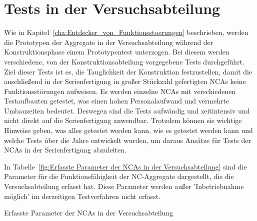 \section{Tests in der Versuchsabteilung}\label{cha_Tests_in_der_Versuchsabteilung}

Wie in Kapitel~\ref{cha:Entdecker_von_Funktionsstoerungen} beschrieben, werden die Prototypen der Aggregate in der Versuchsabteilung während der Konstruktionsphase einem Prototypentest unterzogen. Bei diesem werden verschiedene, von der Konstruktionsabteilung vorgegebene Tests durchgeführt. Ziel dieser Tests ist es, die Tauglichkeit der Konstruktion festzustellen, damit die anschließend in der Serienfertigung in großer Stückzahl gefertigten NCAs keine Funktionsstörungen aufweisen. Es werden einzelne NCAs mit verschiedenen Testaufbauten getestet, was einen hohen Personalaufwand und vermehrte Umbauzeiten bedeutet. Deswegen sind die Tests aufwändig und zeitintensiv und nicht direkt auf die Serienfertigung anwendbar. Trotzdem können sie wichtige Hinweise geben, was alles getestet werden kann, wie es getestet werden kann und welche Tests über die Jahre entwickelt wurden, um daraus Ansätze für Tests der NCAs in der Serienfertigung abzuleiten.

In Tabelle~\ref{fig:Erfasste Parameter der NCAs in der Versuchsabteilung} sind die Parameter für die Funktionsfähigkeit der NC-Aggregate dargestellt, die die Versuchsabteilung erfasst hat. Diese Parameter werden außer 'Inbetriebnahme möglich' im derzeitigen Testverfahren nicht erfasst.



\begin{table}[h]
\center
{}
\caption{Erfasste Parameter der NCAs in der Versuchsabteilung}
\label{fig:Erfasste Parameter der NCAs in der Versuchsabteilung}
\end{table}




